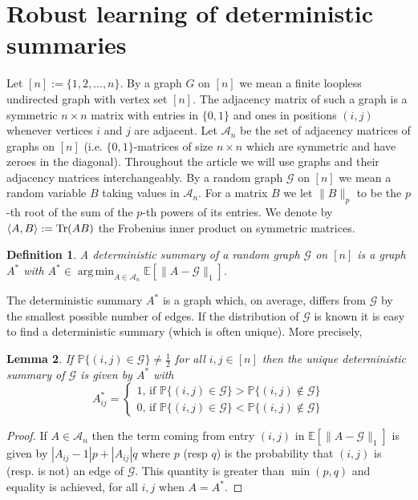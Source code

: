 \documentclass[12pt]{amsart}
\newtheorem{lemma}{Lemma}[section]
\newtheorem{definition}[lemma]{Definition}
\theoremstyle{remark}
\DeclareMathOperator*{\argmin}{arg\,min}
\newcommand{\PP}{\mathbb{P}}
\newcommand{\EE}{\mathbb{E}}
\newcommand{\grG}{{\mathcal{G}}}
\begin{document}
\section{Robust learning of deterministic summaries}
Let $[n]:=\{1,2,\dots, n\}$. By a graph $G$ on $[n]$ we mean a finite loopless undirected graph with vertex set $[n]$. The adjacency matrix of such a graph is a symmetric $n\times n$ matrix with entries in $\{0,1\}$ and ones in positions $(i,j)$ whenever vertices $i$ and $j$ are adjacent. Let $\mathcal{A}_n$ be the set of adjacency matrices of graphs on $[n]$ (i.e. $\{0,1\}$-matrices of size $n\times n$ which are symmetric and have zeroes in the diagonal). Throughout the article we will use graphs and their adjacency matrices interchangeably. By a random graph $\grG$ on $[n]$ we mean a random variable $B$ taking values in $\mathcal{A}_n$.
For a matrix $B$ we let $\|B\|_p$ to be the $p$-th root of the sum of the $p$-th powers of its entries. We denote by $\langle A,B\rangle:={\rm Tr}(AB)$ the Frobenius inner product on symmetric matrices.


\begin{definition} A {\it deterministic summary} of a random graph $\grG$ on $[n]$ is a graph $A^*$ with $A^*\in \argmin_{A\in\mathcal{A}_n} \EE[\|A-\grG\|_1]$.
\end{definition}
The deterministic summary $A^*$ is a graph which, on average, differs from $\grG$ by the smallest possible number of edges. If the distribution of $\grG$ is known it is easy to find a deterministic summary (which is often unique). More precisely,

\begin{lemma}\label{lem: withDist} If $\PP\{(i,j)\in \grG\}\neq \frac{1}{2}$ for all $i,j\in [n]$ then the unique deterministic summary of $\grG$ is given by $A^*$ with
\[A^*_{ij}=
\begin{cases}
1\text{, if $\PP\{(i,j)\in \grG\}> \PP\{(i,j)\not\in \grG\}$}\\
0\text{, if $\PP\{(i,j)\in \grG\}< \PP\{(i,j)\not\in \grG\}$}
\end{cases}\]
\end{lemma}
\begin{proof} If $A\in \mathcal{A}_n$ then the term coming from entry $(i,j)$ in $\EE[\|A-\grG\|_1]$ is given by $|A_{ij}-1|p+|A_{ij}|q$ where $p$ (resp $q$) is the probability that $(i,j)$ is (resp. is not) an edge of $\grG$. This quantity is greater than $\min(p,q)$ and equality is achieved, for all $i,j$ when $A=A^*$. 
\end{proof}
\end{document}
